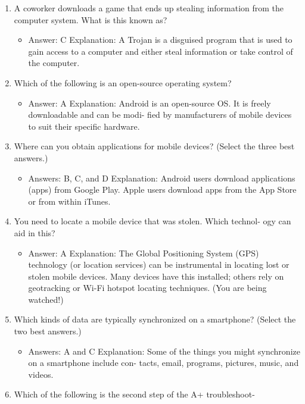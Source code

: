 \documentclass{article}
\begin{document}
\begin{enumerate}
     \item A coworker downloads a game that ends up stealing information
from the computer system. What is this known as?
     \begin{itemize}
         \item Answer:   C                Explanation:        A Trojan is a disguised program that is used to gain access to a computer and either steal information or take control of the computer.
     \end{itemize}
     \item Which of the following is an open-source operating system?
     \begin{itemize}
         \item Answer: A
Explanation: Android is an open-source OS. It is freely downloadable and can be modi-
fied by manufacturers of mobile devices to suit their specific hardware.
     \end{itemize}
     \item Where can you obtain applications for mobile devices? (Select the
three best answers.)
     \begin{itemize}
         \item Answers: B, C, and D
Explanation: Android users download applications (apps) from Google Play. Apple
users download apps from the App Store or from within iTunes.
     \end{itemize}
     \item You need to locate a mobile device that was stolen. Which technol-
ogy can aid in this?
     \begin{itemize}
         \item Answer: A
Explanation: The Global Positioning System (GPS) technology (or location services)
can be instrumental in locating lost or stolen mobile devices. Many devices have this
installed; others rely on geotracking or Wi-Fi hotspot locating techniques. (You are
being watched!)
     \end{itemize}
     \item Which kinds of data are typically synchronized on a smartphone?
(Select the two best answers.)
     \begin{itemize}
         \item Answers: A and C
Explanation: Some of the things you might synchronize on a smartphone include con-
tacts, email, programs, pictures, music, and videos.
     \end{itemize}
     \item Which of the following is the second step of the A+ troubleshoot-

\end{enumerate}
\end{document}
